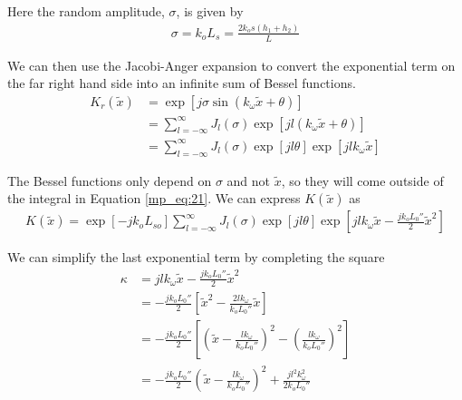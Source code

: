 \noindent Here the random amplitude, $\sigma$, is given by
\begin{equation}
\begin{aligned}
\sigma = k_oL_s = \frac{2k_os(h_1+h_2)}{L}
\end{aligned}
\label{mp_eq:30a}
\end{equation}
\renewcommand{\baselinestretch}{2} \small\normalsize

We can then use the Jacobi-Anger expansion \cite{gbur_math} to convert the exponential term on the far right hand side into an infinite sum of Bessel functions.
\begin{equation}
\begin{aligned}
K_r(\tilde{x}) &=\exp\left[j\sigma \sin\left(k_{\omega} \tilde{x} + \theta\right) \right] \\ &=\sum_{l=-\infty}^{\infty}J_l(\sigma)\exp\left[jl(k_{\omega}\tilde{x} + \theta) \right] \\
&=\sum_{l=-\infty}^{\infty}J_l(\sigma)\exp\left[jl\theta\right]\exp\left[jlk_{\omega}\tilde{x}\right] 
\end{aligned}
\label{mp_eq:31}
\end{equation}
\renewcommand{\baselinestretch}{2} \small\normalsize

The Bessel functions only depend on $\sigma$ and not $\tilde{x}$, so they will come outside of the integral in Equation \ref{mp_eq:21}. We can express $K(\tilde{x})$ as
\begin{equation}
\begin{gathered}
K(\tilde{x}) = \exp\left[-jk_oL_{so}\right]\sum_{l=-\infty}^{\infty}J_l(\sigma)\exp\left[jl\theta\right]\exp\left[jlk_{\omega}\tilde{x}-\frac{jk_oL_0''}{2}\tilde{x}^2\right] 
\end{gathered}
\label{mp_eq:32}
\end{equation}
\renewcommand{\baselinestretch}{2} \small\normalsize

\noindent We can simplify the last exponential term by completing the square
\begin{equation}
\begin{aligned}
\kappa &= jlk_{\omega}\tilde{x}-\frac{jk_oL_0''}{2}\tilde{x}^2\\
&= -\frac{jk_oL_0''}{2}\left[\tilde{x}^2 - \frac{2lk_{\omega}}{k_oL_0''}\tilde{x} \right]\\
&= -\frac{jk_oL_0''}{2}\left[\left(\tilde{x} - \frac{lk_{\omega}}{k_oL_0''} \right)^2 -\left(\frac{lk_{\omega}}{k_oL_0''} \right)^2\right]\\
&= -\frac{jk_oL_0''}{2}\left(\tilde{x} - \frac{lk_{\omega}}{k_oL_0''} \right)^2 + \frac{jl^2k_{\omega}^2}{2k_oL_0''}\\
\end{aligned}
\label{mp_eq:33}
\end{equation}
\renewcommand{\baselinestretch}{2} \small\normalsize

